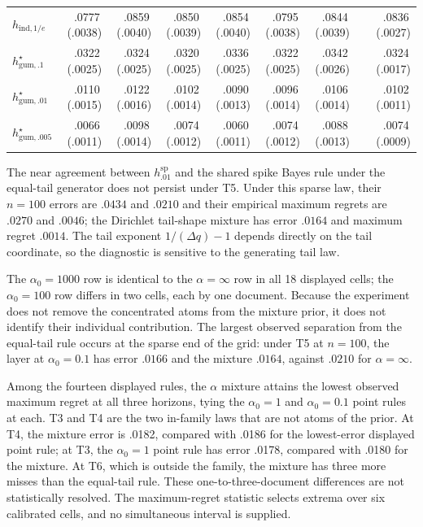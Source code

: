 \documentclass[11pt]{article}
\newcommand{\mcse}[2]{\mbox{#1\,{\fontsize{7}{8}\selectfont(#2)}}}
\begin{document}
\begin{table}[p]
\begin{tabular}{@{}lrrrrrrcr@{}}
$h_{\mathrm{ind},1/e}$ & \mcse{.0777}{.0038} & \mcse{.0859}{.0040} & \mcse{.0850}{.0039} & \mcse{.0854}{.0040} & \mcse{.0795}{.0038} & \mcse{.0844}{.0039} & & \mcse{.0836}{.0027} \\
$h^\star_{\mathrm{gum},.1}$ & \mcse{.0322}{.0025} & \mcse{.0324}{.0025} & \mcse{.0320}{.0025} & \mcse{.0336}{.0025} & \mcse{.0322}{.0025} & \mcse{.0342}{.0026} & & \mcse{.0324}{.0017} \\
$h^\star_{\mathrm{gum},.01}$ & \mcse{.0110}{.0015} & \mcse{.0122}{.0016} & \mcse{.0102}{.0014} & \mcse{.0090}{.0013} & \mcse{.0096}{.0014} & \mcse{.0106}{.0014} & & \mcse{.0102}{.0011} \\
$h^\star_{\mathrm{gum},.005}$ & \mcse{.0066}{.0011} & \mcse{.0098}{.0014} & \mcse{.0074}{.0012} & \mcse{.0060}{.0011} & \mcse{.0074}{.0012} & \mcse{.0088}{.0013} & & \mcse{.0074}{.0009} \\
\bottomrule
\end{tabular}
\end{table}

The near agreement between $h^{\mathrm{sp}}_{.01}$ and the shared spike Bayes rule under the equal-tail generator does not persist under T5.  Under this sparse law, their $n=100$ errors are $.0434$ and $.0210$ and their empirical maximum regrets are $.0270$ and $.0046$; the Dirichlet tail-shape mixture has error $.0164$ and maximum regret $.0014$.  The tail exponent $1/(\Delta q)-1$ depends directly on the tail coordinate, so the diagnostic is sensitive to the generating tail law.

The $\alpha_0=1000$ row is identical to the $\alpha=\infty$ row in all 18 displayed cells; the $\alpha_0=100$ row differs in two cells, each by one document.  Because the experiment does not remove the concentrated atoms from the mixture prior, it does not identify their individual contribution.  The largest observed separation from the equal-tail rule occurs at the sparse end of the grid: under T5 at $n=100$, the layer at $\alpha_0=0.1$ has error $.0166$ and the mixture $.0164$, against $.0210$ for $\alpha=\infty$.

Among the fourteen displayed rules, the $\alpha$ mixture attains the lowest observed maximum regret at all three horizons, tying the $\alpha_0=1$ and $\alpha_0=0.1$ point rules at each.  T3 and T4 are the two in-family laws that are not atoms of the prior.  At T4, the mixture error is .0182, compared with .0186 for the lowest-error displayed point rule; at T3, the $\alpha_0=1$ point rule has error .0178, compared with .0180 for the mixture.  At T6, which is outside the family, the mixture has three more misses than the equal-tail rule.  These one-to-three-document differences are not statistically resolved.  The maximum-regret statistic selects extrema over six calibrated cells, and no simultaneous interval is supplied.
\end{document}
